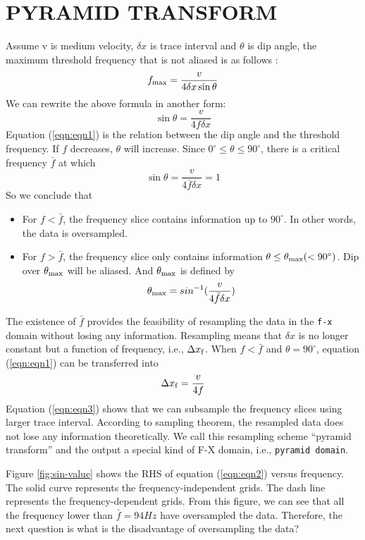 \section{PYRAMID TRANSFORM}
\par
Assume v is medium velocity, $\delta x$ is trace interval and $\theta$ is 
dip angle, the maximum threshold frequency that is not aliased is as follows
\cite[]{SDP00-00-05260526}:
\begin{equation}
        f_{\rm max} = \frac{v}{4\delta x \sin\theta}
\end{equation}
We can rewrite the above formula in another form:
\begin{equation}
        \sin\theta = \frac{v}{4f \delta x} 
\label{eqn:eqn1}
\end{equation}
Equation (\ref{eqn:eqn1}) is the relation between the dip angle and  
the threshold frequency. If $f$ decreases, $\theta$ will increase. 
Since $0^\circ \le \theta \le 90^\circ$, there is a critical frequency 
$\bar{f}$ at which
\begin{equation}  
        \sin\theta = \frac{v}{4\bar{f}\delta x} = 1
\label{eqn:eqn2}
\end{equation}
So we conclude that 
\begin{itemize}
	\item For $f<\bar{f}$, the frequency slice contains information up to 
$90^\circ$. In other words, the data is oversampled. 
	\item For $f>\bar{f}$, the frequency slice only contains information 
$\theta \le \theta_{\rm max} (<90^\circ)$. Dip over $\theta_{\rm max}$ will be  
aliased. And $\theta_{\rm max}$ is defined by
$$
	\theta_{\rm max} = sin^{-1}(\frac{v}{4\bar{f}\delta x})
$$
\end{itemize}
The existence of $\bar{f}$ provides the feasibility of resampling the data in 
the {\tt f-x} domain without losing any information. Resampling means that 
$\delta x$ is no longer constant but a function of frequency, i.e., 
$\Delta x_{\rm f}$. When $f<\bar{f}$ and $\theta=90^\circ$, equation 
(\ref{eqn:eqn1}) can be transferred into 
\begin{equation}
	\Delta x_{\rm f} = \frac{v}{4f}
\label{eqn:eqn3}
\end{equation}
Equation (\ref{eqn:eqn3}) shows that we can subsample the frequency slices using 
larger trace interval. According to sampling theorem, the resampled data 
does not lose any information theoretically. 
We call this resampling scheme ``pyramid transform'' and the output a special 
kind of F-X domain, i.e., {\tt pyramid domain}. 
\par
Figure \ref{fig:sin-value} shows the RHS of equation (\ref{eqn:eqn2}) versus frequency. 
The solid curve represents the frequency-independent grids. 
The dash line represents the frequency-dependent grids. 
From this figure, we can see that all the frequency lower than $\bar{f}=94Hz$ 
have oversampled the data. Therefore, the next question is what is the 
disadvantage of oversampling the data?

